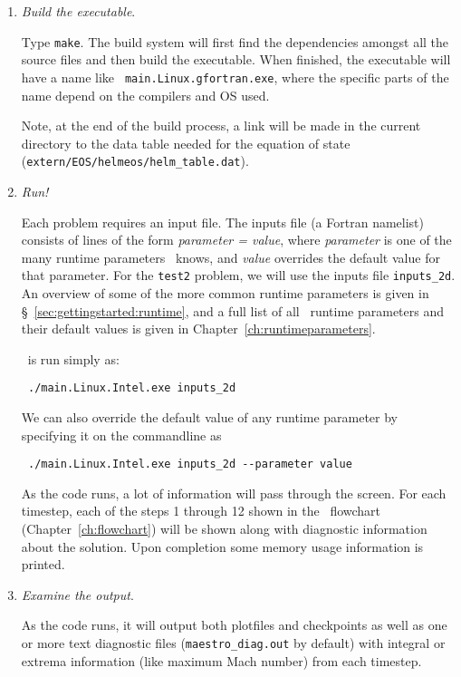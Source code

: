 \begin{enumerate}
\begin{itemize}
\end{itemize}


\item {\em Build the executable}.

Type {\tt make}.  The build system will first find the dependencies
amongst all the source files and then build the executable.  When
finished, the executable will have a name like {\tt
main.Linux.gfortran.exe}, where the specific parts of the name depend
on the compilers and OS used.

Note, at the end of the build process, a link will be made in the current
directory to the data
table needed for the equation of state ({\tt extern/EOS/helmeos/helm\_table.dat}).


\item {\em Run!}

Each problem requires an input file.  The inputs file (a Fortran
namelist) consists of
lines of the form {\em parameter = value}, where {\em parameter} is
one of the many runtime parameters \maestro\ knows, and {\em value}
overrides the default value for that parameter.  For the {\tt test2}
problem, we will use the inputs file {\tt inputs\_2d}.  An overview of
some of the more common runtime parameters is given
in \S~\ref{sec:gettingstarted:runtime}, and a full list of
all \maestro\ runtime parameters and their default values is given in
Chapter~\ref{ch:runtimeparameters}.

\maestro\ is run simply as:
\begin{verbatim}
 ./main.Linux.Intel.exe inputs_2d
\end{verbatim}
We can also override the default value of any runtime parameter by specifying
it on the commandline as
\begin{verbatim}
 ./main.Linux.Intel.exe inputs_2d --parameter value
\end{verbatim}

As the code runs, a lot of information will pass through the screen.
For each timestep, each of the steps 1 through 12 shown in
the \maestro\ flowchart (Chapter~\ref{ch:flowchart}) will be shown
along with diagnostic information about the solution.  Upon completion
some memory usage information is printed.


\item {\em Examine the output}.

As the code runs, it will output both plotfiles and checkpoints as
well as one or more text diagnostic files ({\tt maestro\_diag.out} by
default) with integral or extrema information (like maximum Mach
number) from each timestep.


\end{enumerate}
